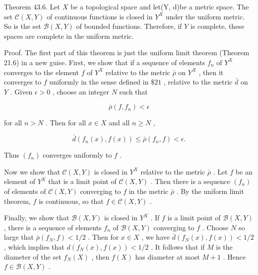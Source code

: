 Theorem 43.6. Let \(X\) be a topological space and let(Y, d)be a metric space. The set \(\mathcal{C}\left( {X,Y}\right)\) of continuous functions is closed in \({Y}^{X}\) under the uniform metric. So is the set \(\mathcal{B}\left( {X,Y}\right)\) of bounded functions. Therefore, if \(Y\) is complete, these spaces are complete in the uniform metric.

Proof. The first part of this theorem is just the uniform limit theorem (Theorem 21.6) in a new guise. First, we show that if a sequence of elements \({f}_{n}\) of \({Y}^{X}\) converges to the element \(f\) of \({Y}^{X}\) relative to the metric \(\bar{\rho }\) on \({Y}^{X}\) , then it converges to \(f\) uniformly in the sense defined in \(\$ {21}\) , relative to the metric \(\bar{d}\) on \(Y\) . Given \(\epsilon  > 0\) , choose an integer \(N\) such that

\[
\bar{\rho }\left( {f,{f}_{n}}\right)  < \epsilon
\]

for all \(n > N\) . Then for all \(x \in  X\) and all \(n \geq  N\) ,

\[
\bar{d}\left( {{f}_{n}\left( x\right) ,f\left( x\right) }\right)  \leq  \bar{\rho }\left( {{f}_{n},f}\right)  < \epsilon .
\]

Thus \(\left( {f}_{n}\right)\) converges uniformly to \(f\) .

Now we show that \(\mathcal{C}\left( {X,Y}\right)\) is closed in \({Y}^{X}\) relative to the metric \(\bar{\rho }\) . Let \(f\) be an element of \({Y}^{X}\) that is a limit point of \(\mathcal{C}\left( {X,Y}\right)\) . Then there is a sequence \(\left( {f}_{n}\right)\) of elements of \(\mathcal{C}\left( {X,Y}\right)\) converging to \(f\) in the metric \(\bar{\rho }\) . By the uniform limit theorem, \(f\) is continuous, so that \(f \in  \mathcal{C}\left( {X,Y}\right)\) .

Finally, we show that \(\mathcal{B}\left( {X,Y}\right)\) is closed in \({Y}^{X}\) . If \(f\) is a limit point of \(\mathcal{B}\left( {X,Y}\right)\) , there is a sequence of elements \({f}_{n}\) of \(\mathcal{B}\left( {X,Y}\right)\) converging to \(f\) . Choose \(N\) so large that \(\bar{\rho }\left( {{f}_{N},f}\right)  < 1/2\) . Then for \(x \in  X\) , we have \(\bar{d}\left( {{f}_{N}\left( x\right) ,f\left( x\right) }\right)  < 1/2\) , which implies that \(d\left( {{f}_{N}\left( x\right) ,f\left( x\right) }\right)  < 1/2\) . It follows that if \(M\) is the diameter of the set \({f}_{N}\left( X\right)\) , then \(f\left( X\right)\) has diameter at most \(M + 1\) . Hence \(f \in  \mathcal{B}\left( {X,Y}\right)\) .

